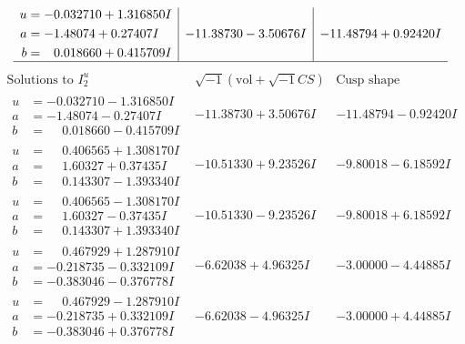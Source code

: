 \documentclass[1p]{elsarticle_modified}
\theoremstyle{definition}
\newcommand{\I}{\sqrt{-1}}
\begin{document}
$$\begin{array}{c|c|c}
\begin{aligned}
u &= -0.032710 + 1.316850 I \\
a &= -1.48074 + 0.27407 I \\
b &= \phantom{-}0.018660 + 0.415709 I\end{aligned}
 & -11.38730 - 3.50676 I & -11.48794 + 0.92420 I\\
 \hline 
 \end{array}$$\newpage$$\begin{array}{c|c|c}  
\text{Solutions to }I^u_{2}& \I (\text{vol} + \sqrt{-1}CS) & \text{Cusp shape}\\
 \hline 
\begin{aligned}
u &= -0.032710 - 1.316850 I \\
a &= -1.48074 - 0.27407 I \\
b &= \phantom{-}0.018660 - 0.415709 I\end{aligned}
 & -11.38730 + 3.50676 I & -11.48794 - 0.92420 I \\ \hline\begin{aligned}
u &= \phantom{-}0.406565 + 1.308170 I \\
a &= \phantom{-}1.60327 + 0.37435 I \\
b &= \phantom{-}0.143307 - 1.393340 I\end{aligned}
 & -10.51330 + 9.23526 I & -9.80018 - 6.18592 I \\ \hline\begin{aligned}
u &= \phantom{-}0.406565 - 1.308170 I \\
a &= \phantom{-}1.60327 - 0.37435 I \\
b &= \phantom{-}0.143307 + 1.393340 I\end{aligned}
 & -10.51330 - 9.23526 I & -9.80018 + 6.18592 I \\ \hline\begin{aligned}
u &= \phantom{-}0.467929 + 1.287910 I \\
a &= -0.218735 - 0.332109 I \\
b &= -0.383046 - 0.376778 I\end{aligned}
 & -6.62038 + 4.96325 I & -3.00000 - 4.44885 I \\ \hline\begin{aligned}
u &= \phantom{-}0.467929 - 1.287910 I \\
a &= -0.218735 + 0.332109 I \\
b &= -0.383046 + 0.376778 I\end{aligned}
 & -6.62038 - 4.96325 I & -3.00000 + 4.44885 I \\ \hline\begin{aligned}

\end{aligned}
\end{array}$$
\end{document}
